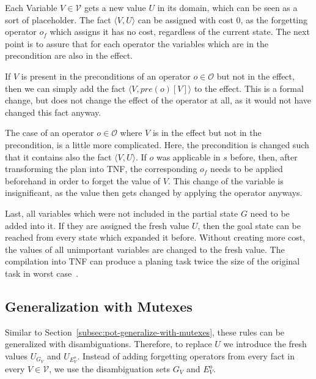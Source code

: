 Each Variable $V\in\mathcal{V}$ gets a new value $U$ in its domain, which can be seen as a sort of placeholder.
The fact $\langle V,U\rangle$ can be assigned with cost 0, as the forgetting operator $o_f$ which assigns it has no cost, regardless of the current state.
The next point is to assure that for each operator the variables which are in the precondition are also in the effect.

If $V$ is present in the preconditions of an operator $o\in\mathcal{O}$ but not in the effect, then we can simply add the fact $\langle V, pre(o)[V] \rangle$ to the effect.
This is a formal change, but does not change the effect of the operator at all, as it would not have changed this fact anyway.

The case of an operator $o\in\mathcal{O}$ where $V$ is in the effect but not in the precondition, is a little more complicated.
Here, the precondition is changed such that it contains also the fact $\langle V, U\rangle$.
If $o$ was applicable in $s$ before, then, after transforming the plan into TNF, the corresponding $o_f$ needs to be applied beforehand in order to forget the value of $V$.
This change of the variable is insignificant, as the value then gets changed by applying the operator anyways.

Last, all variables which were not included in the partial state $G$ need to be added into it.
If they are assigned the fresh value $U$, then the goal state can be reached from every state which expanded it before.
Without creating more cost, the values of all unimportant variables are changed to the fresh value.
The compilation into TNF can produce a planing task twice the size of the original task in worst case~\citep{seipp2015new}.

\subsection{Generalization with Mutexes}\label{subsec:tnf-generalize-with-mutexes}
Similar to Section~\ref{subsec:pot-generalize-with-mutexes}, these rules can be generalized with disambiguations.
Therefore, to replace $U$ we introduce the fresh values $U_{G_V}$ and $U_{E^o_V}$.
Instead of adding forgetting operators from every fact in every $V\in\mathcal{V}$, we use the disambiguation sets $G_V$ and $E_V^o$.

